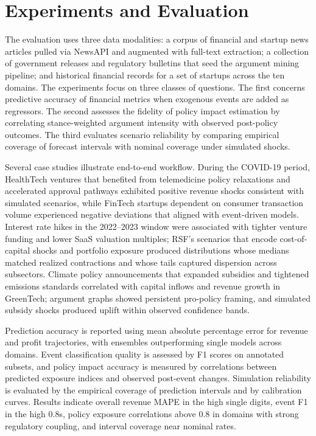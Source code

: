 \documentclass[conference]{IEEEtran}
\begin{document}
\section{Experiments and Evaluation}
The evaluation uses three data modalities: a corpus of financial and startup news articles pulled via NewsAPI and augmented with full-text extraction; a collection of government releases and regulatory bulletins that seed the argument mining pipeline; and historical financial records for a set of startups across the ten domains. The experiments focus on three classes of questions. The first concerns predictive accuracy of financial metrics when exogenous events are added as regressors. The second assesses the fidelity of policy impact estimation by correlating stance-weighted argument intensity with observed post-policy outcomes. The third evaluates scenario reliability by comparing empirical coverage of forecast intervals with nominal coverage under simulated shocks.

Several case studies illustrate end-to-end workflow. During the COVID-19 period, HealthTech ventures that benefited from telemedicine policy relaxations and accelerated approval pathways exhibited positive revenue shocks consistent with simulated scenarios, while FinTech startups dependent on consumer transaction volume experienced negative deviations that aligned with event-driven models. Interest rate hikes in the 2022–2023 window were associated with tighter venture funding and lower SaaS valuation multiples; RSF’s scenarios that encode cost-of-capital shocks and portfolio exposure produced distributions whose medians matched realized contractions and whose tails captured dispersion across subsectors. Climate policy announcements that expanded subsidies and tightened emissions standards correlated with capital inflows and revenue growth in GreenTech; argument graphs showed persistent pro-policy framing, and simulated subsidy shocks produced uplift within observed confidence bands.

Prediction accuracy is reported using mean absolute percentage error for revenue and profit trajectories, with ensembles outperforming single models across domains. Event classification quality is assessed by F1 scores on annotated subsets, and policy impact accuracy is measured by correlations between predicted exposure indices and observed post-event changes. Simulation reliability is evaluated by the empirical coverage of prediction intervals and by calibration curves. Results indicate overall revenue MAPE in the high single digits, event F1 in the high 0.8s, policy exposure correlations above 0.8 in domains with strong regulatory coupling, and interval coverage near nominal rates.
\end{document}
